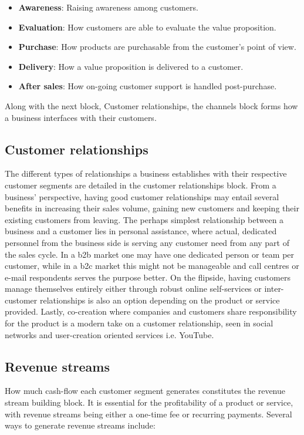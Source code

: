 \begin{itemize}
    \item \textbf{Awareness}: Raising awareness among customers.
    \item \textbf{Evaluation}: How customers are able to evaluate the value proposition.
    \item \textbf{Purchase}: How products are purchasable from the customer's point of view.
    \item \textbf{Delivery}: How a value proposition is delivered to a customer.
    \item \textbf{After sales}: How on-going customer support is handled post-purchase.
\end{itemize}
Along with the next block, Customer relationships, the channels block forms how a business interfaces with their customers. 

\subsection{Customer relationships}
The different types of relationships a business establishes with their respective customer segments are detailed in the customer relationships block. From a business' perspective, having good customer relationships may entail several benefits in increasing their sales volume, gaining new customers and keeping their existing customers from leaving. The perhaps simplest relationship between a business and a customer lies in personal assistance, where actual, dedicated personnel from the business side is serving any customer need from any part of the sales cycle. In a \gls{b2b} market one may have one dedicated person or team per customer, while in a \gls{b2c} market this might not be manageable and call centres or e-mail respondents serves the purpose better. On the flipside, having customers manage themselves entirely either through robust online self-services or inter-customer relationships is also an option depending on the product or service provided. Lastly, co-creation where companies and customers share responsibility for the product is a modern take on a customer relationship, seen in social networks and user-creation oriented services i.e. YouTube.

\subsection{Revenue streams}
How much cash-flow each customer segment generates constitutes the revenue stream building block. It is essential for the profitability of a product or service, with revenue streams being either a one-time fee or recurring payments. Several ways to generate revenue streams include:

